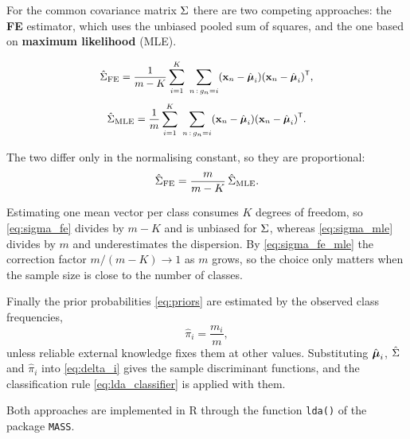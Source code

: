 For the common covariance matrix $\Sigma$ there are two competing approaches: the
\textbf{FE} estimator, which uses the unbiased pooled sum of squares, and the
one based on \textbf{maximum likelihood} (MLE).

\begin{definition}
  \label{def:pooled_covariance}
  \begin{equation}
    \label{eq:sigma_fe}
    \small
    \hat{\Sigma}_{\text{FE}}=\frac{1}{m-K}\sum_{i=1}^{K}\;\sum_{n\,:\,g_n=i}
      (\mathbf{x}_n-\hat{\boldsymbol{\mu}}_i)(\mathbf{x}_n-\hat{\boldsymbol{\mu}}_i)^{\mathsf{T}},
  \end{equation}
  \begin{equation}
    \label{eq:sigma_mle}
    \small
    \hat{\Sigma}_{\text{MLE}}=\frac{1}{m}\sum_{i=1}^{K}\;\sum_{n\,:\,g_n=i}
      (\mathbf{x}_n-\hat{\boldsymbol{\mu}}_i)(\mathbf{x}_n-\hat{\boldsymbol{\mu}}_i)^{\mathsf{T}} .
  \end{equation}
\end{definition}

The two differ only in the normalising constant, so they are proportional:
\begin{equation}
  \label{eq:sigma_fe_mle}
  \hat{\Sigma}_{\text{FE}}=\frac{m}{m-K}\,\hat{\Sigma}_{\text{MLE}} .
\end{equation}

\begin{remark}
  Estimating one mean vector per class consumes $K$ degrees of freedom, so
  \eqref{eq:sigma_fe} divides by $m-K$ and is unbiased for $\Sigma$, whereas
  \eqref{eq:sigma_mle} divides by $m$ and underestimates the dispersion. By
  \eqref{eq:sigma_fe_mle} the correction factor $m/(m-K)\to 1$ as $m$ grows, so
  the choice only matters when the sample size is close to the number of
  classes.
\end{remark}

Finally the prior probabilities \eqref{eq:priors} are estimated by the observed
class frequencies,
\begin{equation}
  \label{eq:priors_hat}
  \hat{\pi}_i=\frac{m_i}{m},
\end{equation}
unless reliable external knowledge fixes them at other values. Substituting
$\hat{\boldsymbol{\mu}}_i$, $\hat{\Sigma}$ and $\hat{\pi}_i$ into \eqref{eq:delta_i} gives the
sample discriminant functions, and the classification rule
\eqref{eq:lda_classifier} is applied with them.

\begin{remark}
  Both approaches are implemented in \textsf{R} through the function
  \texttt{lda()} of the package \texttt{MASS}.
\end{remark}

